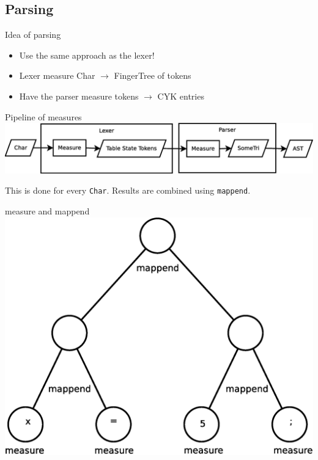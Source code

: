 \documentclass{beamer}
\begin{document}
\subsection{Parsing}
\begin{frame}{Idea of parsing}
    \begin{itemize}
        \item Use the same approach as the lexer!
        \item Lexer measure Char $\rightarrow$ FingerTree of tokens
        \item Have the parser measure tokens $\rightarrow$ CYK entries
    \end{itemize}
\end{frame}

\begin{frame}{Pipeline of measures}
\includegraphics[width=\textwidth]{pipeline.eps}

This is done for every \texttt{Char}. Results are combined using
\texttt{mappend}.
\end{frame}

\begin{frame}{measure and mappend}
    \centering
    \includegraphics[width=.8\textwidth]{tree.eps}
\end{frame}
\end{document}
